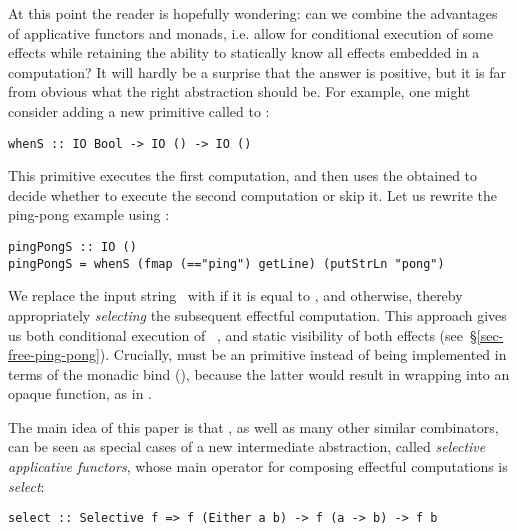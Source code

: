 At this point the reader is hopefully wondering: can we combine the advantages
of applicative functors and monads, i.e. allow for conditional execution of some
effects while retaining the ability to statically know all effects embedded in
a computation? It will hardly be a surprise that the answer is positive, but it
is far from obvious what the right abstraction should be. For example, one might
consider adding a new primitive called  to :

\begin{verbatim}
whenS :: IO Bool -> IO () -> IO ()
\end{verbatim}

\noindent
This primitive executes the first computation, and then uses the obtained
 to decide whether to execute the second computation or skip it. Let us
rewrite the ping-pong example using :

\vspace{0.5mm}
\begin{verbatim}
pingPongS :: IO ()
pingPongS = whenS (fmap (=="ping") getLine) (putStrLn "pong")
\end{verbatim}
\vspace{0.5mm}

\noindent
We replace the input string~ with  if it is equal to ,
and  otherwise, thereby appropriately \emph{selecting} the subsequent
effectful computation. This approach gives us both conditional execution of
~, and static visibility of both effects
(see~\S\ref{sec-free-ping-pong}). Crucially,  must be an 
primitive instead of being implemented in terms of the monadic bind (\hs{>>=}),
because the latter would result in wrapping  into an opaque
function, as in .

The main idea of this paper is that , as well as many other similar
combinators, can be seen as special cases of a new intermediate abstraction,
called \emph{selective applicative functors}, whose main operator for composing
effectful computations is \emph{select}:

\begin{verbatim}
select :: Selective f => f (Either a b) -> f (a -> b) -> f b
\end{verbatim}

